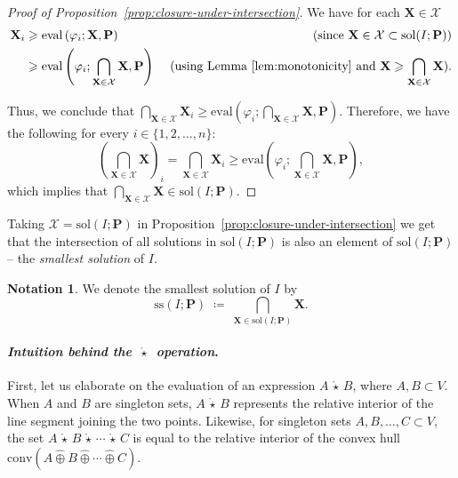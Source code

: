 \documentclass[10pt]{amsart}
\theoremstyle{plain}
\theoremstyle{definition}
\newtheorem{notation}[lemma]{Notation}
\providecommand{\bP}[0]{\ensuremath{\mathbf P}\xspace}
\providecommand{\bX}[0]{\ensuremath{\mathbf X}\xspace}
\let\geq\geqslant
\providecommand{\defeq}[0]{\ensuremath{\;\coloneqq\;}\xspace}
\providecommand{\cplus}[0]{\ensuremath{\hat{\oplus}}\xspace}
\providecommand{\cmult}[0]{\ensuremath{{\,\mathring{\star}\,}}\xspace}
\providecommand{\conv}[1]{\ensuremath{\mathrm{conv}{\left({#1}\right)}\xspace}}
\providecommand{\sol}{\ensuremath{\mathrm{sol}}\xspace}
\providecommand{\ssol}{\ensuremath{\mathrm{ss}}\xspace}
\providecommand{\evalmap}[0]{\ensuremath{\mathrm{eval}}\xspace}
\begin{document}
\begin{proof}[Proof of Proposition~\ref{prop:closure-under-intersection}]
We have for each $\bX \in \mathcal{X}$
\begin{align*}
    \bX_i &\geq \evalmap\left(\varphi_i;\bX,\bP\right) & \text{ (since $\bX \in \mathcal{X} \subset \sol(I;\bP)$)}\\
    & \geq  \evalmap\left(\varphi_i;\mathop{\bigcap}\limits_{\bX \in \mathcal{X}}\bX ,\bP\right) & \text{ (using Lemma~\ref{lem:monotonicity} and $\bX \geq \mathop{\bigcap}\limits_{\bX \in \mathcal{X}}\bX$)}.
\end{align*}

Thus, we conclude that $\mathop{\bigcap}\limits_{\bX \in \mathcal{X}}\bX_i\geq \evalmap\left(\varphi_i;\mathop{\bigcap}\limits_{\bX \in \mathcal{X}}\bX ,\bP\right)$. Therefore, we have the following for every $i\in \{1,2,\dots,n\}$: $$\left(\mathop{\bigcap}\limits_{\bX \in \mathcal{X}}\bX\right)_i=\mathop{\bigcap}\limits_{\bX \in \mathcal{X}}\bX_i\geq \evalmap\left(\varphi_i;\mathop{\bigcap}\limits_{\bX \in \mathcal{X}}\bX ,\bP\right),$$
which implies that $\mathop{\bigcap}\limits_{\bX \in \mathcal{X}}\bX \in \sol(I;\bP)$. 
\end{proof}


Taking $\mathcal{X} = \sol(I;\bP)$ in Proposition~\ref{prop:closure-under-intersection} we get that the intersection of all solutions in
$\sol(I;\bP)$ is also an element of $\sol(I;\bP)$ -- the {\em smallest solution} of $I$. 

\begin{notation}
\label{not:ss}
We denote the smallest solution of $I$ by 
\begin{equation}
\label{eqn:smallest-sol-def}
    \ssol(I;\bP) \defeq \bigcap\limits_{\bX\in\sol(I;\bP)} \bX.
\end{equation}
\end{notation}




\paragraph{\emph{Intuition behind the $\cmult$ operation}.}
First, let us elaborate on the evaluation of an expression $A\cmult B$, where $A, B\subset V$. 
When $A$ and $B$ are singleton sets, $A\cmult B$ represents the relative interior of the line segment joining the two points. 
Likewise, for singleton sets $A, B,\dotsc, C\subset V$, the set $A\cmult B \cmult \dotsi \cmult C$ is equal to the relative interior of the convex hull $\conv{A\cplus B \cplus \dotsi \cplus C}$. 
\end{document}
